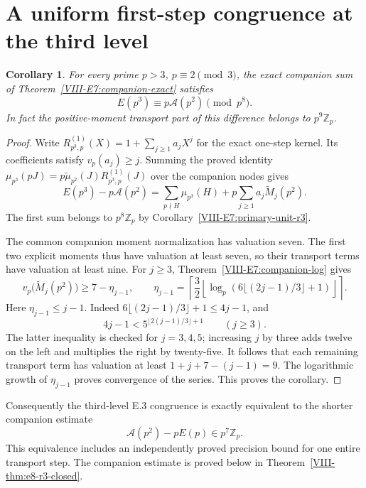 \documentclass[11pt,letterpaper]{article}
\newtheorem{corollary}[theorem]{Corollary}
\numberwithin{equation}{section}
\begin{document}
\section{A uniform first-step congruence at the third level}\label{loc-VIII-14}
\label{VIII-sec:E7firststepr3}
\begin{corollary}\label{VIII-E7:first-step-r3}
For every prime $p>3$, $p\equiv2\pmod3$, the exact companion sum
of Theorem~\ref{VIII-E7:companion-exact} satisfies
\[
 \boxed{E(p^3)\equiv p\mathcal A(p^2)\pmod{p^8}.}
\]
In fact the positive-moment transport part of this difference belongs
to $p^9\mathbb Z_p$.
\end{corollary}
\begin{proof}
Write $R^{(1)}_{p^3,p}(X)=1+\sum_{j\ge1}a_jX^j$ for the exact
one-step kernel. Its coefficients satisfy $v_p(a_j)\ge j$.
Summing the proved identity
$\mu_{p^3}(pJ)=p\widetilde\mu_{p^2}(J)R^{(1)}_{p^3,p}(J)$
over the companion nodes gives
\[
 E(p^3)-p\mathcal A(p^2)
 =\sum_{p\nmid H}\mu_{p^3}(H)
  +p\sum_{j\ge1}a_j\widetilde M_j(p^2).
\]
The first sum belongs to $p^8\mathbb Z_p$ by
Corollary~\ref{VIII-E7:primary-unit-r3}.

The common companion moment normalization has valuation seven.
The first two explicit moments thus have valuation at least seven,
so their transport terms have valuation at least nine. For $j\ge3$,
Theorem~\ref{VIII-E7:companion-log} gives
\[
 v_p\bigl(\widetilde M_j(p^2)\bigr)\ge7-\eta_{j-1},\qquad
 \eta_{j-1}=\left\lceil\frac32
 \left\lfloor\log_p(6\lfloor(2j-1)/3\rfloor+1)\right\rfloor
 \right\rceil.
\]
Here $\eta_{j-1}\le j-1$. Indeed
$6\lfloor(2j-1)/3\rfloor+1\le4j-1$, and
\[
 4j-1<5^{\lfloor2(j-1)/3\rfloor+1}\qquad(j\ge3).
\]
The latter inequality is checked for $j=3,4,5$; increasing $j$ by
three adds twelve on the left and multiplies the right by twenty-five.
It follows that each remaining transport term has valuation at least
$1+j+7-(j-1)=9$. The logarithmic growth of $\eta_{j-1}$ proves
convergence of the series. This proves the corollary.
\end{proof}

Consequently the third-level E.3 congruence is exactly
equivalent to the shorter companion estimate
\[
 \mathcal A(p^2)-pE(p)\in p^7\mathbb Z_p.
\]
This equivalence includes an independently proved precision bound for
one entire transport step. The companion estimate is proved below
in Theorem~\ref{VIII-thm:e8-r3-closed}.
\end{document}
